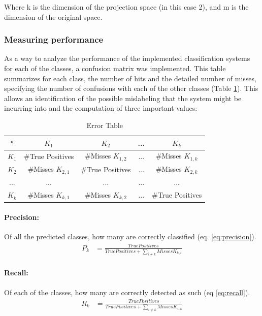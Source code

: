 \documentclass{IEEEtran}
\begin{document}
Where k is the dimension of the projection space (in this case 2), and m is the dimension of the original space.

\subsubsection{Measuring performance}
\label{sub:measures}
As a way to analyze the performance of the implemented classification systems for each of the classes, 
a confusion matrix was implemented. 
This table summarizes for each class, the number of hits and the detailed number of misses, specifying 
the number of confusions with each of the other classes (Table \ref{tb:tbError}).
This allows an identification of the possible mislabeling that the system might be incurring into and
the computation of three important values:

\begin{table}
\begin{tabular}{|c | c | c| c| c|}
\hline
° &  $K_{1}$ &  $K_{2}$  & ... & $K_{k}$ \\
\hline
 $K_{1}$  & \#True Positives & \#Misses $K_{1,2}$ & ... & \#Misses $K_{1,k}$  \\
\hline
 $K_{2}$  & \#Misses $K_{2,1}$ & \#True Positives &  ... & \#Misses $K_{2,k}$  \\
\hline
... & ... & ... & ... & ... \\
\hline
 $K_{k}$  & \#Misses $K_{k,1}$ & \#Misses $K_{k,2}$ & ... & \#True Positives   \\
\hline
\end{tabular}
\caption{Error Table}
\label{tb:tbError}
\end{table}
 
\paragraph{Precision:}  
Of all the predicted classes, how many are correctly classified (eq. \ref{eq:precision}).
\begin{align}
P_k &= \frac{True Positives}{True Positives + \sum_{i \ne k}{Misses K_{k,i}}} \label{eq:precision} 
\end{align}
\paragraph{Recall:} 
Of each of the classes, how many are correctly detected as such (eq \ref{eq:recall}).
\begin{align}
R_k &= \frac{True Positives}{True Positives + \sum_{i \ne k}{Misses K_{i,k}}} \label{eq:recall}
\end{align}
\end{document}
